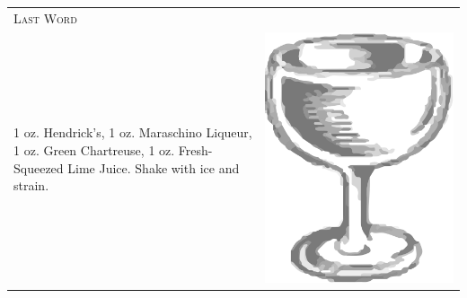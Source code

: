 \documentclass{article}
\begin{document}
\begin{tabular}{p{2in} p{0.5in}}
\multicolumn{2}{p{3in}}{\centering\Huge\textsc{Last Word}} \\ 
    \vspace{-0.1in}1 oz. Hendrick's, 1 oz. Maraschino Liqueur, 1 oz. Green Chartreuse, 1 oz. Fresh-Squeezed Lime Juice. Shake with ice and strain. &
    \vspace{-0.1in} \includegraphics{coupe.png}
\end{tabular}
\end{document}
